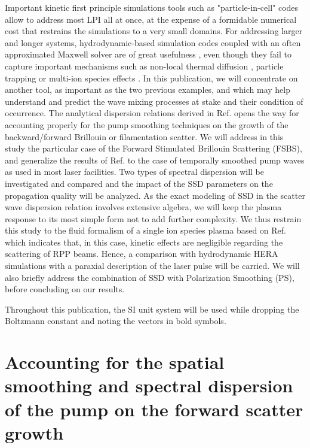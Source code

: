 \documentclass[
 reprint,
 amsmath,amssymb,
 aps,
]{revtex4-1}
\begin{document}
Important kinetic first principle simulations tools such as "particle-in-cell" codes  \cite[]{Lefebvre_2003,fonseca_osiris,Smilei}  allow  to address most LPI all at once, at the expense of a formidable numerical cost that restrains the simulations to a very small domains. For addressing  larger and longer systems,  hydrodynamic-based simulation codes coupled with an often approximated Maxwell solver are of great usefulness \cite{Berger_1995,Still_2006,Loiseau_2006, Huller_2006}, even though they fail to capture important mechanisms  such as non-local thermal diffusion \cite[]{POP_Schurtz_2000,PRL_Froula_2007},
particle trapping   \cite[]{POP_Benisti_2008,POP_Berger_2013} or multi-ion species effects \cite[]{POP_Williams_95,Abramowitz,POP_Berger_2005b,Ruyer_2020}.
In this publication, we will concentrate on another tool,  as important as the two previous examples, and which may help understand and predict the wave mixing processes at stake and their condition of occurrence. The analytical dispersion relations derived in Ref.  \cite[]{Ruyer_FSBS} opens the way for accounting properly for the pump smoothing techniques on the growth of the backward/forward Brillouin or filamentation scatter. 
We will address in this study the particular case of the Forward Stimulated  Brillouin Scattering (FSBS), and generalize the results of Ref.  \cite[]{Ruyer_FSBS} to the case of temporally smoothed pump waves as used in most laser facilities. Two types of spectral dispersion will be investigated and compared and the impact of the SSD parameters on the propagation quality will be analyzed. 
As the exact modeling of SSD in the scatter wave dispersion relation involves extensive algebra, we will keep the plasma response to its most simple form not to add further complexity. We thus restrain this study to the fluid formalism of a single ion species plasma based on   Ref.  \cite[]{Ruyer_FSBS}  which indicates that, in this case, kinetic effects are negligible regarding the scattering of  RPP beams.
Hence, a comparison with hydrodynamic HERA simulations with a paraxial description of the  laser pulse will be carried.
We will also briefly address the combination of SSD with Polarization Smoothing (PS),
before concluding on our results.

Throughout this publication, the SI unit system will be used while dropping the Boltzmann constant and noting the vectors in bold symbols.


\section{Accounting for the spatial smoothing and spectral dispersion of the pump on the forward scatter growth}
\end{document}
